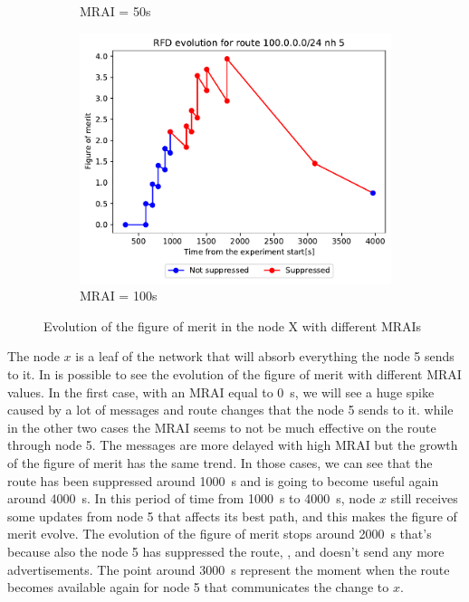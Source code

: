 \begin{figure}[h]
\begin{subfigure}[b]{0.3\textwidth}
         \caption{MRAI = 50s}
         \label{fig:clique_x_mrai50}
     \end{subfigure}
     \hfill
     \begin{subfigure}[b]{0.3\textwidth}
         \centering
         \includegraphics[width=\textwidth]{images/RFD/clique/FigureOfMerit/mrai21_RFD_x_rfd_R1.pdf}
         \caption{MRAI = 100s}
         \label{fig:clique_x_mrai100}
     \end{subfigure}
        \caption{Evolution of the figure of merit in the node X with different MRAIs}
        \label{fig:clique_nodex}
\end{figure}

The node $x$ is a leaf of the network that will absorb everything the node \num{5}
sends to it.
In  is possible to see the evolution of the figure of merit
with different \ac{MRAI} values.
In the first case, with an \ac{MRAI} equal to \SI{0}{\second}, we will see a huge
spike caused by a lot of messages and route changes that the node \num{5} sends
to it.
while in the other two cases  
the \ac{MRAI} seems to not be much effective on the route through node \num{5}.
The messages are more delayed with high \ac{MRAI} but the growth of the figure
of merit has the same trend.
In those cases, we can see that the route has been suppressed around \SI{1000}{\second}
and is going to become useful again around \SI{4000}{\second}.
In this period of time from \SI{1000}{\second} to \SI{4000}{\second}, node $x$ still
receives some updates from node \num{5} that affects its best path, and this
makes the figure of merit evolve.
The evolution of the figure of merit stops around \SI{2000}{\second} that's because
also the node \num{5} has suppressed the route, , and
doesn't send any more advertisements.
The point around \SI{3000}{\second} represent the moment when the route becomes
available again for node \num{5} that communicates the change to $x$.

